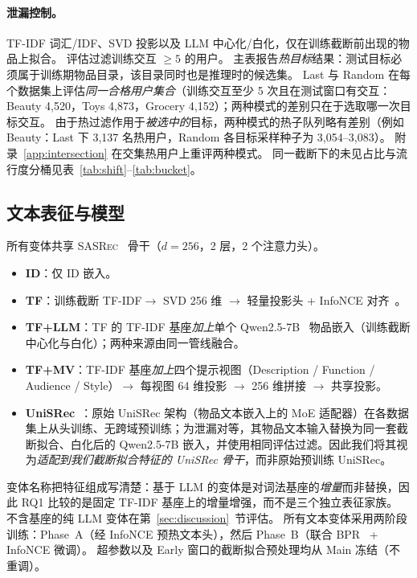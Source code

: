 \documentclass[sigconf,natbib=true,anonymous]{acmart}
\newcommand{\tfidf}{\textsc{TF-IDF}\xspace}
\newcommand{\tfllm}{\textsc{TF+LLM}\xspace}
\newcommand{\tfmv}{\textsc{TF+MV}\xspace}
\newcommand{\base}{\textsc{SASRec}\xspace}
\begin{document}
\paragraph{泄漏控制。}
\tfidf 词汇/IDF、SVD 投影以及 LLM 中心化/白化，仅在训练截断前出现的物品上拟合。
评估过滤训练交互 $\ge 5$ 的用户。
主表报告\emph{热目标}结果：测试目标必须属于训练期物品目录，该目录同时也是推理时的候选集。
Last 与 Random 在每个数据集上评估\emph{同一合格用户集合}（训练交互至少 5 次且在测试窗口有交互：Beauty 4{,}520，Toys 4{,}873，Grocery 4{,}152）；两种模式的差别只在于选取哪一次目标交互。
由于热过滤作用于\emph{被选中的}目标，两种模式的热子队列略有差别（例如 Beauty：Last 下 3{,}137 名热用户，Random 各目标采样种子为 3{,}054--3{,}083）。
附录~\ref{app:intersection} 在交集热用户上重评两种模式。
同一截断下的未见占比与流行度分桶见表~\ref{tab:shift}--\ref{tab:bucket}。

\subsection{文本表征与模型}
\label{sec:models}

所有变体共享 \base~\cite{kang2018sasrec} 骨干（$d{=}256$，2 层，2 个注意力头）。

\begin{itemize}[leftmargin=*,itemsep=1pt]
\item \textbf{ID}：仅 ID 嵌入。
\item \textbf{TF}：训练截断 \tfidf $\to$ SVD 256 维 $\to$ 轻量投影头 + InfoNCE 对齐~\cite{oord2018cpc}。
\item \textbf{\tfllm}：TF 的 \tfidf 基座\emph{加上}单个 Qwen2.5-7B~\cite{qwen2024qwen25} 物品嵌入（训练截断中心化与白化）；两种来源由同一管线融合。
\item \textbf{\tfmv}：\tfidf 基座\emph{加上}四个提示视图（Description / Function / Audience / Style）$\to$ 每视图 64 维投影 $\to$ 256 维拼接 $\to$ 共享投影。
\item \textbf{UniSRec}~\cite{hou2022unisrec}：原始 UniSRec 架构（物品文本嵌入上的 MoE 适配器）在各数据集上从头训练、无跨域预训练；为泄漏对等，其物品文本输入替换为同一套截断拟合、白化后的 Qwen2.5-7B 嵌入，并使用相同评估过滤。因此我们将其视为\emph{适配到我们截断拟合特征的 UniSRec 骨干}，而非原始预训练 UniSRec。
\end{itemize}

变体名称把特征组成写清楚：基于 LLM 的变体是对词法基座的\emph{增量}而非替换，因此 RQ1 比较的是固定 \tfidf 基座上的增量增强，而不是三个独立表征家族。
不含基座的纯 LLM 变体在第~\ref{sec:discussion}~节评估。
所有文本变体采用两阶段训练：Phase~A（经 InfoNCE 预热文本头），然后 Phase~B（联合 BPR~\cite{rendle2009bpr} + InfoNCE 微调）。
超参数以及 Early 窗口的截断拟合预处理均从 Main 冻结（不重调）。
\end{document}
